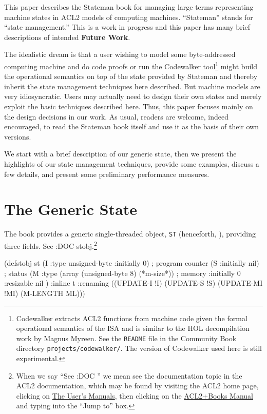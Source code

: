 \documentclass[submission,copyright,creativecommons]{eptcs}
\newcommand{\ptt}[1]{\tt{#1}}
\begin{document}
This paper describes the Stateman book for managing large terms representing
machine states in ACL2 models of computing machines.  ``Stateman'' stands for
``state management.''  This is a work in progress and this paper has many
brief descriptions of intended {\bf{Future Work}}.

The idealistic dream is that a user wishing to model some byte-addressed
computing machine and do code proofs or run the Codewalker
tool\footnote{Codewalker extracts ACL2 functions from machine code given the
  formal operational semantics of the ISA and is similar to the HOL
  decompilation work by Magnus Myreen\cite{Myreen-09,Myreen-12}.  See the
  {\ptt{README}} file in the Community Book directory
  {\ptt{projects/codewalker/}}.  The version of Codewalker used here is still
      experimental.} might build the operational semantics on top of the
state provided by Stateman and thereby inherit the state management
techniques here described.  But machine models are very idiosyncratic.  Users
may actually need to design their own states and merely exploit the basic
techniques described here.  Thus, this paper focuses mainly on the design
decisions in our work.  As usual, readers are welcome, indeed encouraged, to
read the Stateman book itself and use it as the basis of their own versions.



We start with a brief description of our generic state, then we present the
highlights of our state management techniques, provide some examples, discuss
a few details, and present some preliminary performance measures.

\section{The Generic State}

The book provides a generic single-threaded object, {\ptt{ST}} (henceforth,
), providing three fields.  See :DOC stobj.\footnote{When we say ``See
  :DOC '' we mean see the documentation topic  in the ACL2
  documentation, which may be found by visiting the ACL2 home
  page\cite{acl2-home-page}, clicking on {\underline{The User's Manuals}},
  then clicking on the {\underline{ACL2+Books Manual}} and typing  into
  the ``Jump to'' box.}

\begin{acl2p}
(defstobj st
  (I  :type unsigned-byte :initially 0)          ; program counter
  (S  :initially nil)                            ; status
  (M  :type (array (unsigned-byte 8) (*m-size*)) ; memory
      :initially 0
      :resizable nil
      )
  :inline t
  :renaming
  ((UPDATE-I   !I)
   (UPDATE-S   !S)
   (UPDATE-MI  !MI)
   (M-LENGTH   ML)))
\end{acl2p}
\end{document}
